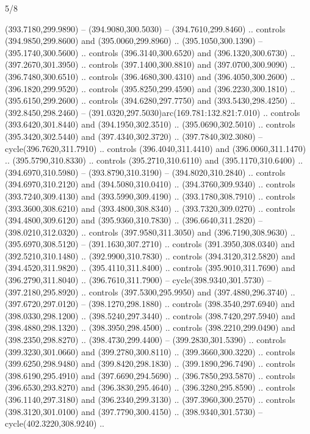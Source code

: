 \begin{flagdescription}{5/8}
\begin{scope}[xshift=0.5\flaglength,yshift=0.5\flagwidth,scale=\flagwidth/475.63]
\begin{scope}[y=0.8pt, x=0.8pt, yscale=-1, xscale=1,shift={(-450,-300)}]
\begin{scope}[cm={{1.0,0.0,0.0,1.0,(-0.0002,0.12556)}},cm={{1.0,0.0,0.0,1.0,(0.00179,0.0)}}]
\begin{scope}[fill=c00863d]
  (393.7180,299.9890) -- (394.9080,300.5030) -- (394.7610,299.8460) .. controls
  (394.9850,299.8600) and (395.0060,299.8960) .. (395.1050,300.1390) --
  (395.1740,300.5600) .. controls (396.3140,300.6520) and (396.1320,300.6730) ..
  (397.2670,301.3950) .. controls (397.1400,300.8810) and (397.0700,300.9090) ..
  (396.7480,300.6510) .. controls (396.4680,300.4310) and (396.4050,300.2600) ..
  (396.1820,299.9520) .. controls (395.8250,299.4590) and (396.2230,300.1810) ..
  (395.6150,299.2600) .. controls (394.6280,297.7750) and (393.5430,298.4250) ..
  (392.8450,298.2460) -- (391.0320,297.5030)arc(169.781:132.821:7.010) ..
  controls (393.6420,301.8440) and (394.1950,302.3510) .. (395.0690,302.5010) ..
  controls (395.3420,302.5440) and (397.4340,302.3720) .. (397.7840,302.3080) --
  cycle(396.7620,311.7910) .. controls (396.4040,311.4410) and
  (396.0060,311.1470) .. (395.5790,310.8330) .. controls (395.2710,310.6110) and
  (395.1170,310.6400) .. (394.6970,310.5980) -- (393.8790,310.3190) --
  (394.8020,310.2840) .. controls (394.6970,310.2120) and (394.5080,310.0410) ..
  (394.3760,309.9340) .. controls (393.7240,309.4130) and (393.5990,309.4190) ..
  (393.1780,308.7910) .. controls (393.3600,308.6210) and (393.4800,308.8340) ..
  (393.7320,309.0270) .. controls (394.4800,309.6120) and (395.9360,310.7830) ..
  (396.6640,311.2820) -- (398.0210,312.0320) .. controls (397.9580,311.3050) and
  (396.7190,308.9630) .. (395.6970,308.5120) -- (391.1630,307.2710) .. controls
  (391.3950,308.0340) and (392.5210,310.1480) .. (392.9900,310.7830) .. controls
  (394.3120,312.5820) and (394.4520,311.9820) .. (395.4110,311.8400) .. controls
  (395.9010,311.7690) and (396.2790,311.8040) .. (396.7610,311.7900) --
  cycle(398.9340,301.5730) -- (397.2180,295.8920) .. controls
  (397.5300,295.9950) and (397.4880,296.3740) .. (397.6720,297.0120) --
  (398.1270,298.1880) .. controls (398.3540,297.6940) and (398.0330,298.1200) ..
  (398.5240,297.3440) .. controls (398.7420,297.5940) and (398.4880,298.1320) ..
  (398.3950,298.4500) .. controls (398.2210,299.0490) and (398.2350,298.8270) ..
  (398.4730,299.4400) -- (399.2830,301.5390) .. controls (399.3230,301.0660) and
  (399.2780,300.8110) .. (399.3660,300.3220) .. controls (399.6250,298.9480) and
  (399.8420,298.1830) .. (399.1890,296.7490) .. controls (398.6190,295.4910) and
  (397.6690,294.5690) .. (396.7850,293.5870) .. controls (396.6530,293.8270) and
  (396.3830,295.4640) .. (396.3280,295.8590) .. controls (396.1140,297.3180) and
  (396.2340,299.3130) .. (397.3960,300.2570) .. controls (398.3120,301.0100) and
  (397.7790,300.4150) .. (398.9340,301.5730) -- cycle(402.3220,308.9240) ..

\end{scope}
\end{scope}
\end{scope}
\end{scope}
\end{flagdescription}
